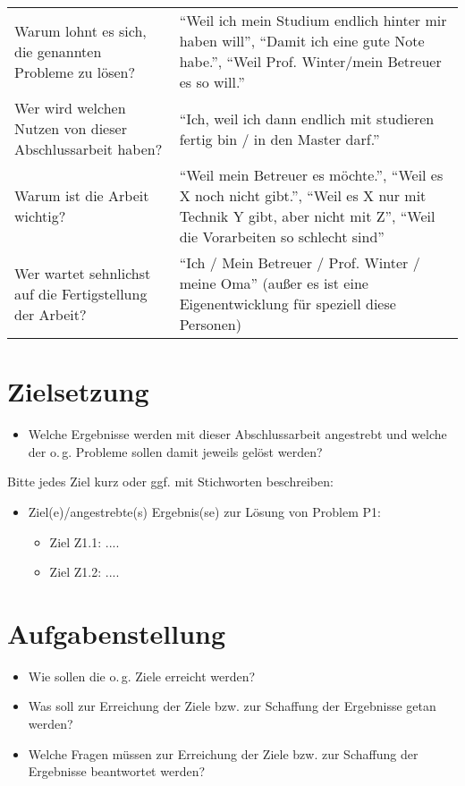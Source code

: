 \documentclass[headsepline,titlepage,twoside,12pt]{report}
\begin{document}
\begin{tabulary}{\textwidth}{LL}
Warum lohnt es sich, die genannten Probleme zu lösen?						&\enquote{Weil ich mein Studium endlich hinter mir haben will}, \enquote{Damit ich eine gute Note habe.}, \enquote{Weil Prof. Winter/mein Betreuer es so will.}\\
Wer wird welchen Nutzen von dieser Abschlussarbeit haben?					&\enquote{Ich, weil ich dann endlich mit studieren fertig bin / in den Master darf.}\\
Warum ist die Arbeit wichtig?												&\enquote{Weil mein Betreuer es möchte.}, \enquote{Weil es X noch nicht gibt.}, \enquote{Weil es X nur mit Technik Y gibt, aber nicht mit Z}, \enquote{Weil die Vorarbeiten so schlecht sind}\\
Wer wartet sehnlichst auf die Fertigstellung der Arbeit?					&\enquote{Ich / Mein Betreuer / Prof. Winter / meine Oma} (außer es ist eine Eigenentwicklung für speziell diese Personen)\\
\end{tabulary}

\section{Zielsetzung}\label{sec:zielsetzung}

\begin{itemize}
\item Welche Ergebnisse werden mit dieser Abschlussarbeit angestrebt und welche der o.\,g. Probleme sollen damit jeweils gelöst werden?
\end{itemize}
Bitte jedes Ziel kurz oder ggf. mit Stichworten beschreiben:
\begin{itemize}
\item Ziel(e)/angestrebte(s) Ergebnis(se) zur Lösung von Problem P1:
	\begin{itemize}
	\item Ziel Z1.1: ....
	\item Ziel Z1.2: ....
	\end{itemize}
\end{itemize}

\section{Aufgabenstellung}

\begin{itemize}
\item Wie sollen die o.\,g. Ziele erreicht werden?
\item Was soll zur Erreichung der Ziele bzw. zur Schaffung der Ergebnisse getan werden?
\item Welche Fragen müssen zur Erreichung der Ziele bzw. zur Schaffung der Ergebnisse beantwortet  werden?
\end{itemize}
\end{document}
